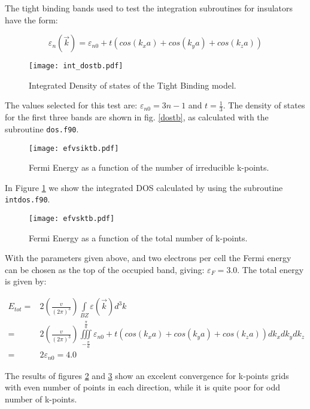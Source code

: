 The tight binding bands used to test the integration subroutines for
insulators have the form:

\begin{equation}
\varepsilon_n(\vec{k})=\varepsilon_{n0}+t\left(cos(k_x a)+cos(k_y
a)+cos(k_za)\right)
\end{equation}

\begin{figure}[h]
\texttt{[image: int\_dostb.pdf]}
\caption{Integrated Density of states of the Tight Binding model.}
\label{idostb}
\end{figure}

The values selected for this test are:
$\varepsilon_{n0}=3n-1$ and $t=\tfrac{1}{3}$. The density of
states for the first three bands are shown in fig. \ref{dostb}, as
calculated with the subroutine \verb"dos.f90".

\begin{figure}[h]
\texttt{[image: efvsiktb.pdf]}
\caption{Fermi Energy as a function of the number of irreducible k-points.
} \label{efvsiktb}
\end{figure}

In Figure \ref{idostb} we show the integrated DOS calculated by using the
subroutine \verb"intdos.f90".  

\begin{figure}[h]
\texttt{[image: efvsktb.pdf]}
\caption{Fermi Energy as a function of the total number of k-points.
} \label{efvsktb}
\end{figure}


With the parameters given above, and two electrons per cell the Fermi
energy can be chosen as the top of the occupied band, giving: $\varepsilon_F=3.0$. 
The total energy is given by:

\begin{equation}
\begin{align}
E_{tot}=&2\left(\frac{v}{(2\pi)^3}\right)\int\limits_{BZ}\varepsilon(\vec{k})d^3k\\
=&2\left(\frac{v}{(2\pi)^3}\right)\iiint\limits_{-\frac{\pi}{a}}^{\frac{\pi}{a}}
\varepsilon_{n0}+t\left(cos(k_x
a)+cos(k_ya)+cos(k_za)\right)dk_xdk_ydk_z\\
=&2\varepsilon_{n0}=4.0
\end{align}
\end{equation}


The results of figures \ref{efvsiktb}
and \ref{efvsktb} show an excelent convergence for k-points grids with
even
number of points in each direction, while it is quite poor for odd number
of k-points.

